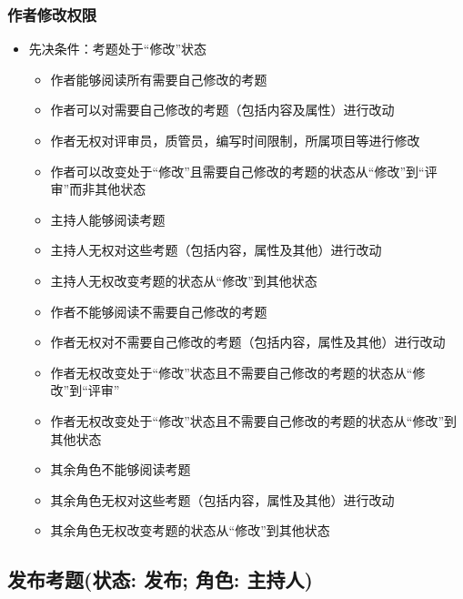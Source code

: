 \documentclass[hyperref, a4paper]{ctexart}
\providecommand{\tightlist}{%
  \setlength{\itemsep}{0pt}\setlength{\parskip}{0pt}}
\begin{document}
\hypertarget{ux4f5cux8005ux4feeux6539ux6743ux9650}{%
\subsubsection{作者修改权限}\label{ux4f5cux8005ux4feeux6539ux6743ux9650}}

\begin{itemize}
\tightlist
\item
  先决条件：考题处于``修改''状态

  \begin{itemize}
  \tightlist
  \item
    作者能够阅读所有需要自己修改的考题
  \item
    作者可以对需要自己修改的考题（包括内容及属性）进行改动
  \item
    作者无权对评审员，质管员，编写时间限制，所属项目等进行修改
  \item
    作者可以改变处于``修改''且需要自己修改的考题的状态从``修改''到``评审''而非其他状态
  \item
    主持人能够阅读考题
  \item
    主持人无权对这些考题（包括内容，属性及其他）进行改动
  \item
    主持人无权改变考题的状态从``修改''到其他状态
  \item
    作者不能够阅读不需要自己修改的考题
  \item
    作者无权对不需要自己修改的考题（包括内容，属性及其他）进行改动
  \item
    作者无权改变处于``修改''状态且不需要自己修改的考题的状态从``修改''到``评审''
  \item
    作者无权改变处于``修改''状态且不需要自己修改的考题的状态从``修改''到其他状态
  \item
    其余角色不能够阅读考题
  \item
    其余角色无权对这些考题（包括内容，属性及其他）进行改动
  \item
    其余角色无权改变考题的状态从``修改''到其他状态
  \end{itemize}
\end{itemize}

\hypertarget{ux53d1ux5e03ux8003ux9898ux72b6ux6001-ux53d1ux5e03-ux89d2ux8272-ux4e3bux6301ux4eba}{%
\subsection{发布考题(状态: 发布; 角色:
主持人)}\label{ux53d1ux5e03ux8003ux9898ux72b6ux6001-ux53d1ux5e03-ux89d2ux8272-ux4e3bux6301ux4eba}}
\end{document}
